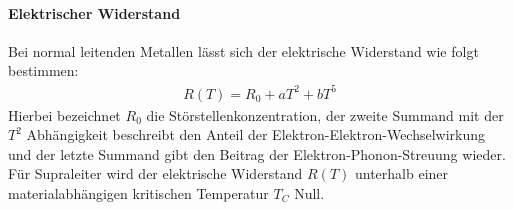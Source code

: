 \paragraph{Elektrischer Widerstand}
Bei normal leitenden Metallen l\"{a}sst sich der elektrische Wider{\-}stand wie folgt bestimmen:
\begin{align*}
	R(T) = R_0 + aT^2 + bT^5
\end{align*}
Hierbei bezeichnet $R_0$ die St\"{o}rstellenkonzentration, der zweite Summand mit der $T^2$ Abh\"{a}ngigkeit beschreibt den Anteil der Elektron-Elektron-Wechselwirkung und der letzte Summand gibt den Beitrag der Elektron-Phonon-Streuung wieder. \\
F\"{u}r Supraleiter wird der elektrische Widerstand $R(T)$ unterhalb einer materialabh\"{a}ngigen kritischen Temperatur $T_C$ Null.

